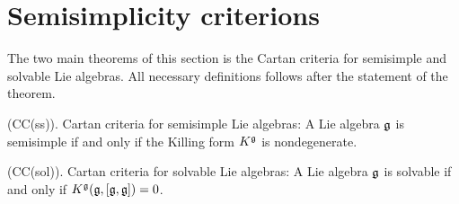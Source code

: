 \section{Semisimplicity criterions}
The two main theorems of this section is the Cartan criteria for semisimple and solvable Lie algebras.
All necessary definitions follows after the statement of the theorem.
\begin{dang}
    \begin{theorem}\label{theorem: CC(ss)}
        (CC(ss)).
         Cartan criteria for semisimple Lie algebras: 
        A Lie algebra $\mathfrak{g}$ is semisimple if and only if the Killing form $K^{\mathfrak{g}}$ is nondegenerate. 
    \end{theorem}
\end{dang}

\begin{dang}
    \begin{theorem}\label{theorem: CC(sol)}
        (CC(sol)).
        Cartan criteria for solvable Lie algebras: A Lie algebra $\mathfrak{g}$ is solvable if and only if 
        $K^{\mathfrak{g}}(\mathfrak{g},[\mathfrak{g},\mathfrak{g}])=0$.
    \end{theorem}
\end{dang}


